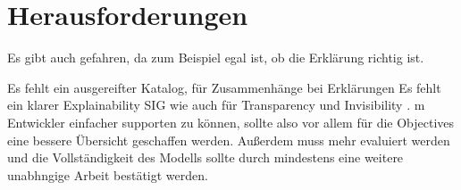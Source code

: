 \section{Herausforderungen}


Es gibt auch gefahren, da zum Beispiel egal ist, ob die Erklärung richtig ist.

Es fehlt ein ausgereifter Katalog, für Zusammenhänge bei Erklärungen
Es fehlt ein klarer Explainability SIG wie auch für Transparency \cite{do2010software} und Invisibility \cite{carvalho2020developers}. m Entwickler einfacher supporten zu können, sollte also vor allem für die Objectives eine bessere Übersicht geschaffen werden.
Außerdem muss mehr evaluiert werden und die Vollständigkeit des Modells sollte durch mindestens eine weitere unabhngige Arbeit bestätigt werden.
